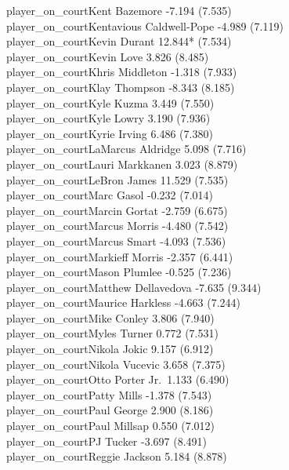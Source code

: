 \documentclass[
  landscape]{article}
\begin{document}
player\_on\_courtKent Bazemore -7.194 (7.535)\\
player\_on\_courtKentavious Caldwell-Pope -4.989 (7.119)\\
player\_on\_courtKevin Durant 12.844* (7.534)\\
player\_on\_courtKevin Love 3.826 (8.485)\\
player\_on\_courtKhris Middleton -1.318 (7.933)\\
player\_on\_courtKlay Thompson -8.343 (8.185)\\
player\_on\_courtKyle Kuzma 3.449 (7.550)\\
player\_on\_courtKyle Lowry 3.190 (7.936)\\
player\_on\_courtKyrie Irving 6.486 (7.380)\\
player\_on\_courtLaMarcus Aldridge 5.098 (7.716)\\
player\_on\_courtLauri Markkanen 3.023 (8.879)\\
player\_on\_courtLeBron James 11.529 (7.535)\\
player\_on\_courtMarc Gasol -0.232 (7.014)\\
player\_on\_courtMarcin Gortat -2.759 (6.675)\\
player\_on\_courtMarcus Morris -4.480 (7.542)\\
player\_on\_courtMarcus Smart -4.093 (7.536)\\
player\_on\_courtMarkieff Morris -2.357 (6.441)\\
player\_on\_courtMason Plumlee -0.525 (7.236)\\
player\_on\_courtMatthew Dellavedova -7.635 (9.344)\\
player\_on\_courtMaurice Harkless -4.663 (7.244)\\
player\_on\_courtMike Conley 3.806 (7.940)\\
player\_on\_courtMyles Turner 0.772 (7.531)\\
player\_on\_courtNikola Jokic 9.157 (6.912)\\
player\_on\_courtNikola Vucevic 3.658 (7.375)\\
player\_on\_courtOtto Porter Jr.~1.133 (6.490)\\
player\_on\_courtPatty Mills -1.378 (7.543)\\
player\_on\_courtPaul George 2.900 (8.186)\\
player\_on\_courtPaul Millsap 0.550 (7.012)\\
player\_on\_courtPJ Tucker -3.697 (8.491)\\
player\_on\_courtReggie Jackson 5.184 (8.878)\\
\end{document}
